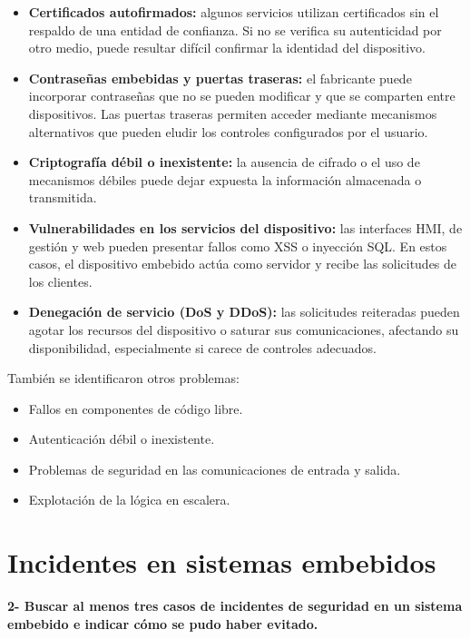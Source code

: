 \documentclass[12pt,a4paper]{article}
\begin{document}
\begin{itemize}
    \item \textbf{Certificados autofirmados:} algunos servicios utilizan certificados sin el respaldo de una entidad de confianza. Si no se verifica su autenticidad por otro medio, puede resultar difícil confirmar la identidad del dispositivo.

    \item \textbf{Contraseñas embebidas y puertas traseras:} el fabricante puede incorporar contraseñas que no se pueden modificar y que se comparten entre dispositivos. Las puertas traseras permiten acceder mediante mecanismos alternativos que pueden eludir los controles configurados por el usuario.

    \item \textbf{Criptografía débil o inexistente:} la ausencia de cifrado o el uso de mecanismos débiles puede dejar expuesta la información almacenada o transmitida.

    \item \textbf{Vulnerabilidades en los servicios del dispositivo:} las interfaces HMI, de gestión y web pueden presentar fallos como XSS o inyección SQL. En estos casos, el dispositivo embebido actúa como servidor y recibe las solicitudes de los clientes.

    \item \textbf{Denegación de servicio (DoS y DDoS):} las solicitudes reiteradas pueden agotar los recursos del dispositivo o saturar sus comunicaciones, afectando su disponibilidad, especialmente si carece de controles adecuados.
\end{itemize}

También se identificaron otros problemas:
\begin{itemize}
    \item Fallos en componentes de código libre.
    \item Autenticación débil o inexistente.
    \item Problemas de seguridad en las comunicaciones de entrada y salida.
    \item Explotación de la lógica en escalera.
\end{itemize}

\section{Incidentes en sistemas embebidos}
\textbf{2- Buscar al menos tres casos de incidentes de seguridad en un sistema embebido e indicar cómo se pudo haber evitado.}
\end{document}
